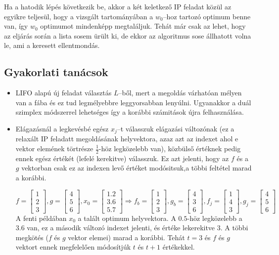 Ha a hatodik lépés következik be, akkor a két keletkező IP feladat közül az
egyikre teljesül, hogy a vizsgált tartományában a $w_0$--hoz tartozó optimum
benne van, így $w_0$ optimumot mindenképp megtaláljuk. Tehát már csak az lehet,
hogy az eljárás során a lista sosem ürült ki, de ekkor az algoritmus sose
állhatott volna le, ami a keresett ellentmondás.

\subsection{Gyakorlati tanácsok}
\begin{itemize}
  \item LIFO alapú új feladat választás $L$--ből, mert a megoldás várhatóan
  mélyen van a fába és ez tud legmélyebbre leggyorsabban lenyúlni. Ugyanakkor a
  duál szimplex módszerrel lehetséges így a korábbi számitások újra felhasználása.
  \item Elágazásnál a legkevésbé egész $x_j$--t válasszuk elágazási változónak
  (ez a relaxált IP feladatt megoldásának helyvektora, azaz azt az indexet ahol
  e vektor elemének törtrésze $\frac{1}{2}$-höz legközelebb van), közbülső
  értéknek pedig ennek egész értékét (lefelé kerekitve) válasszuk. Ez azt
  jelenti, hogy az $f$ és a $g$ vektorban csak ez az indexen levő értéket
  modósitsuk,a többi feltétel marad a korábbi.
  
  \[
  f=\begin{bmatrix}
  1 \\
  2 \\
  3 
  \end{bmatrix},
  g = \begin{bmatrix}
  4 \\
  5 \\
  6 
  \end{bmatrix},
  x_0 = \begin{bmatrix}
  1.2 \\
  3.6 \\
  5.7 
  \end{bmatrix}
  \Rightarrow
  f_b=\begin{bmatrix}
  1 \\
  2 \\
  3 
  \end{bmatrix},
  g_b = \begin{bmatrix}
  4 \\
  3 \\
  6 
  \end{bmatrix},
  f_j=\begin{bmatrix}
  1 \\
  4 \\
  3 
  \end{bmatrix},
  g_j = \begin{bmatrix}
  4 \\
  5 \\
  6 
  \end{bmatrix}
  \] A fenti példában $x_0$ a talált optimum helyvektora. A $0.5$-höz
  legközelebb a $3.6$ van, ez a második változó indexet jelenti, és értéke lekerekitve $3$. A
  többi megkötés ($f$ és $g$ vektor elemei) marad a korábbi. Tehát $t=3$ és $f$
  és $g$ vektort ennek megfelelően módosítjúk $t$ és $t+1$ értékekkel. 
\end{itemize}
